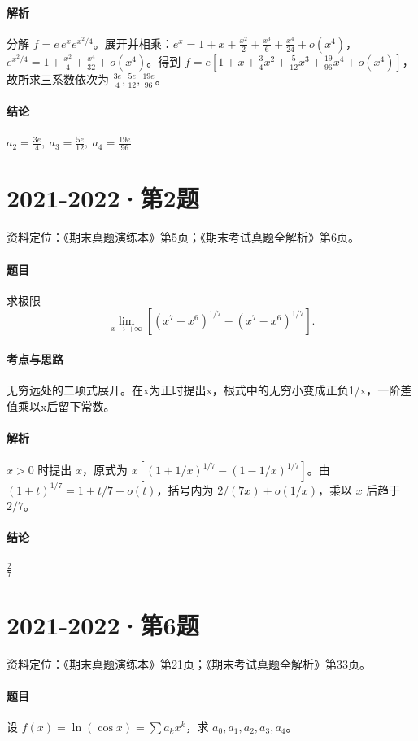 \documentclass[UTF8,fontset=fandol,12pt,oneside,openany]{ctexrep}
\theoremstyle{definition}
\begin{document}
\paragraph{解析}
分解 $f=e\,e^x e^{x^2/4}$。展开并相乘：$e^x=1+x+\frac{x^2}2+\frac{x^3}6+\frac{x^4}{24}+o(x^4)$，$e^{x^2/4}=1+\frac{x^2}4+\frac{x^4}{32}+o(x^4)$。得到 $f=e[1+x+\frac34x^2+\frac5{12}x^3+\frac{19}{96}x^4+o(x^4)]$，故所求三系数依次为 $\frac{3e}4,\frac{5e}{12},\frac{19e}{96}$。
\paragraph{结论}
$a_2=\frac{3e}4,\ a_3=\frac{5e}{12},\ a_4=\frac{19e}{96}$

\par\addvspace{18pt}\noindent\begin{minipage}{\linewidth}
\section{2021-2022·第2题}
\label{exam:08:q9}
资料定位：《期末真题演练本》第5页；《期末考试真题全解析》第6页。
\paragraph{题目}
求极限 \[\lim_{x\to+\infty}\left[(x^7+x^6)^{1/7}-(x^7-x^6)^{1/7}\right].\]
\end{minipage}\par
\paragraph{考点与思路}
无穷远处的二项式展开。在x为正时提出x，根式中的无穷小变成正负1/x，一阶差值乘以x后留下常数。
\paragraph{解析}
$x>0$ 时提出 $x$，原式为 $x[(1+1/x)^{1/7}-(1-1/x)^{1/7}]$。由 $(1+t)^{1/7}=1+t/7+o(t)$，括号内为 $2/(7x)+o(1/x)$，乘以 $x$ 后趋于 $2/7$。
\paragraph{结论}
$\frac27$

\par\addvspace{18pt}\noindent\begin{minipage}{\linewidth}
\section{2021-2022·第6题}
\label{exam:08:q10}
资料定位：《期末真题演练本》第21页；《期末考试真题全解析》第33页。
\paragraph{题目}
设 $f(x)=\ln(\cos x)=\sum a_kx^k$，求 $a_0,a_1,a_2,a_3,a_4$。
\end{minipage}\par
\end{document}
